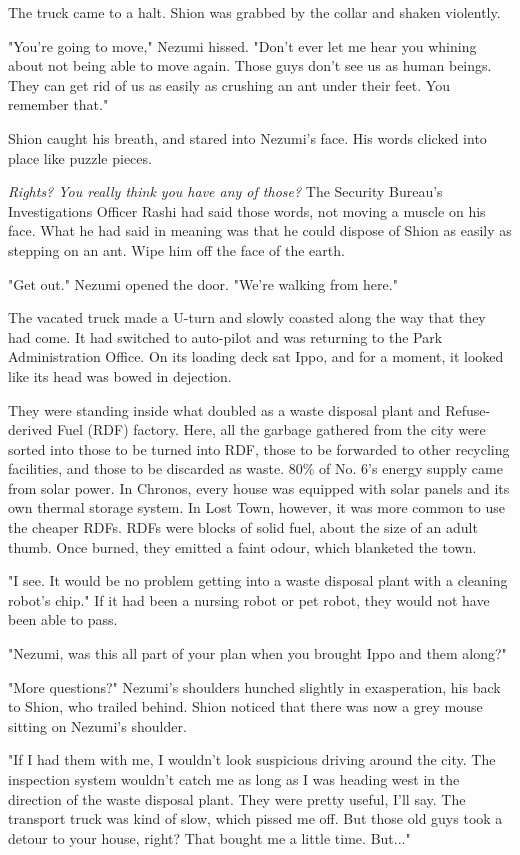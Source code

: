 The truck came to a halt. Shion was grabbed by the collar and shaken
violently.

"You're going to move," Nezumi hissed. "Don't ever let me hear you
whining about not being able to move again. Those guys don't see us as
human beings. They can get rid of us as easily as crushing an ant under
their feet. You remember that."

Shion caught his breath, and stared into Nezumi's face. His words
clicked into place like puzzle pieces.

\emph{Rights? You really think you have any of those?} The Security Bureau's
Investigations Officer Rashi had said those words, not moving a muscle
on his face. What he had said in meaning was that he could dispose of
Shion as easily as stepping on an ant. Wipe him off the face of the
earth.

"Get out." Nezumi opened the door. "We're walking from here."

The vacated truck made a U-turn and slowly coasted along the way that
they had come. It had switched to auto-pilot and was returning to the
Park Administration Office. On its loading deck sat Ippo, and for a
moment, it looked like its head was bowed in dejection.

They were standing inside what doubled as a waste disposal plant and
Refuse-derived Fuel (RDF) factory. Here, all the garbage gathered from
the city were sorted into those to be turned into RDF, those to be
forwarded to other recycling facilities, and those to be discarded as
waste. 80\% of No. 6's energy supply came from solar power. In Chronos,
every house was equipped with solar panels and its own thermal storage
system. In Lost Town, however, it was more common to use the cheaper
RDFs. RDFs were blocks of solid fuel, about the size of an adult thumb.
Once burned, they emitted a faint odour, which blanketed the town.

"I see. It would be no problem getting into a waste disposal plant with
a cleaning robot's chip." If it had been a nursing robot or pet robot,
they would not have been able to pass.

"Nezumi, was this all part of your plan when you brought Ippo and them
along?"

"More questions?" Nezumi's shoulders hunched slightly in exasperation,
his back to Shion, who trailed behind. Shion noticed that there was now
a grey mouse sitting on Nezumi's shoulder.

"If I had them with me, I wouldn't look suspicious driving around the
city. The inspection system wouldn't catch me as long as I was heading
west in the direction of the waste disposal plant. They were pretty
useful, I'll say. The transport truck was kind of slow, which pissed me
off. But those old guys took a detour to your house, right? That bought
me a little time. But..."


